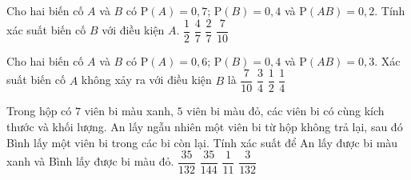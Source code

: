 \begin{ex}%
Cho hai biến cố $A$ và $B$ có $\mathrm{P}\left(A\right) = 0{,}7$; $\mathrm{P}\left(B\right) = 0{,}4$ và
$\mathrm{P}\left(AB\right)=0{,}2$. Tính xác suất biến cố $B$ với điều kiện $A$. 
	\choice
	{$\dfrac{1}{2}$}
	{$\dfrac{4}{7}$}
	{\True $\dfrac{2}{7}$}
	{$\dfrac{7}{10}$}
\end{ex}
\begin{ex}%
	Cho hai biến cố $A$ và $B$ có $\mathrm{P}\left(A\right) = 0{,}6$; $\mathrm{P}\left(B\right) = 0{,}4$ và $\mathrm{P}\left(AB\right)=0{,}3$. Xác suất biến cố $A$ không xảy ra với điều kiện $B$ là 
	\choice
	{$\dfrac{7}{10}$}
	{$\dfrac{3}{4}$}
	{$\dfrac{1}{2}$}
	{\True $\dfrac{1}{4}$}
\end{ex}
\begin{ex}%
Trong hộp có $7$ viên bi màu xanh, $5$ viên bi màu đỏ, các viên bi có cùng kích thước và khối lượng. An lấy ngẫu nhiên một viên bi từ hộp không trả lại, sau đó Bình lấy một viên bi trong các bi còn lại. Tính xác suất để An lấy được bi màu xanh và Bình lấy được bi màu đỏ.
	\choice
	{\True $\dfrac{35}{132}$}
	{$\dfrac{35}{144}$}
	{$\dfrac{1}{11}$}
	{$\dfrac{3}{132}$}
\end{ex}
